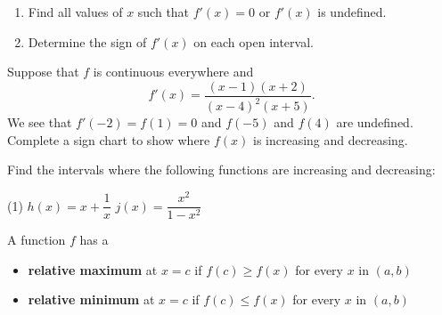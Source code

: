 \documentclass[../mathNotesPreamble]{subfiles}
\begin{document}
  \begin{thmBox*}
    \begin{enumerate}
      \item Find all values of $x$ such that $f'(x)=0$ or $f'(x)$ is undefined.
      \item Determine the sign of $f'(x)$ on each open interval.
    \end{enumerate}
  \end{thmBox*}
  \begin{ex*}
    Suppose that $f$ is continuous everywhere and
      \[f'(x)=\dfrac{(x-1)(x+2)}{(x-4)^2(x+5)}.\]
    We see that $f'(-2)=f(1)=0$ and $f(-5)$ and $f(4)$ are undefined. Complete a sign chart to show where $f(x)$ is increasing and decreasing.
  \end{ex*}
  \pagebreak

  \begin{ex*}
    Find the intervals where the following functions are increasing and decreasing:
  \end{ex*}
  \pagebreak

  \begin{extasks}[after-item-skip=\stretch{1}](1)
    \task $h(x)=x+\dfrac{1}{x}$
    \task $j(x)=\dfrac{x^2}{1-x^2}$
  \end{extasks}
  \pagebreak

  \begin{defn*}
    A function $f$ has a
    \begin{itemize}
      \item
        \textbf{relative maximum} at $x=c$ if $f(c)\geq f(x)$ for every $x$ in $(a,b)$
      \item
        \textbf{relative minimum} at $x=c$ if $f(c)\leq f(x)$ for every $x$ in $(a,b)$
    \end{itemize}
  \end{defn*}
\end{document}
